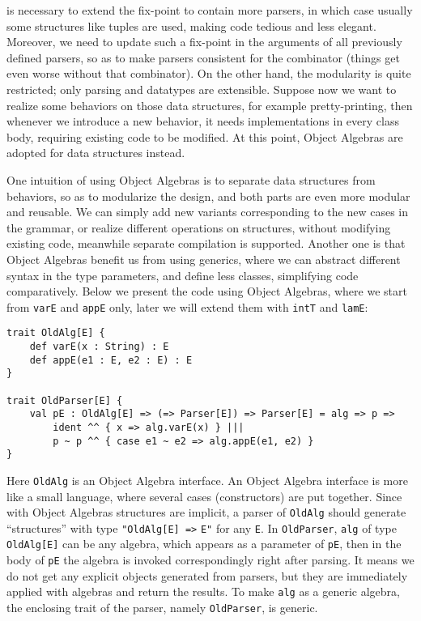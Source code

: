 is necessary to extend the fix-point to contain more parsers, in which case usually some structures like tuples are used,
making code tedious and less elegant. Moreover, we need to update such a fix-point in the arguments of all previously defined parsers, so as to make parsers consistent for the combinator (things get even worse without that combinator).
On the other hand, the modularity is quite restricted; only parsing and datatypes are extensible.
Suppose now we want to realize some behaviors on those data structures, for example pretty-printing, then whenever we introduce a new behavior,
it needs implementations in every class body, requiring existing code to be modified. At this point, Object Algebras are adopted for data structures
instead.

One intuition of using Object Algebras is to separate data structures from behaviors, so as to modularize the design, and both parts are even more modular and reusable. We can simply add new variants corresponding to the new cases in the grammar, or realize different operations on structures, without modifying existing code, meanwhile separate compilation is supported. Another one is that Object Algebras benefit us from using generics, where we can abstract different syntax in the type parameters, and define less classes, simplifying code comparatively. Below we present the code using Object Algebras, where we start from \lstinline{varE} and \lstinline{appE} only, later we will extend them with \lstinline{intT} and \lstinline{lamE}:
\begin{lstlisting}
trait OldAlg[E] {
    def varE(x : String) : E
    def appE(e1 : E, e2 : E) : E
}

trait OldParser[E] {
    val pE : OldAlg[E] => (=> Parser[E]) => Parser[E] = alg => p =>
        ident ^^ { x => alg.varE(x) } |||
        p ~ p ^^ { case e1 ~ e2 => alg.appE(e1, e2) }
}
\end{lstlisting}
Here \lstinline{OldAlg} is an Object Algebra interface. An Object Algebra interface is more like a small language, where several cases (constructors) are put together. Since with Object Algebras structures are implicit, a parser of \lstinline{OldAlg} should generate ``structures'' with
type \lstinline{"OldAlg[E] =>} \lstinline{E"} for any \lstinline{E}. In \lstinline{OldParser}, \lstinline{alg} of type
\lstinline{OldAlg[E]} can be any algebra, which appears as a parameter of \lstinline{pE}, then in the body of \lstinline{pE} the algebra
is invoked correspondingly right after parsing. It means we do not get any explicit objects generated from parsers, but they are immediately applied with algebras and return the results. To make \lstinline{alg} as a generic algebra, the enclosing trait of the parser, namely \lstinline{OldParser}, is generic.


